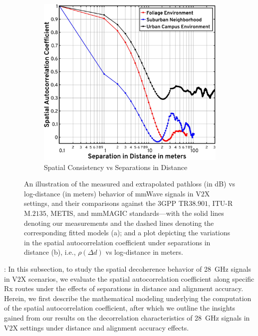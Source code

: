 \documentclass[10pt, twocolumn]{IEEEtran}
\begin{document}
{\begin{figure} [t]
    \begin{subfigure}{0.5\linewidth}
        \centering
        \includegraphics[width=1.0\linewidth]{figs/spatial_consistency_vs_distance.pdf}
        \caption{Spatial Consistency vs Separations in Distance}
        \label{F7b}
    \end{subfigure}
    \vspace{-8mm}
    \caption{An illustration of the measured and extrapolated pathloss (in dB) vs log-distance (in meters) behavior of mmWave signals in V$2$X settings, and their comparisons against the $3$GPP TR$38.901$, ITU-R M.$2135$, METIS, and mmMAGIC standards---with the solid lines denoting our measurements and the dashed lines denoting the corresponding fitted models (a); and a plot depicting the variations in the spatial autocorrelation coefficient under separations in distance (b), i.e., $\rho(\Delta d)$ vs log-distance in meters.}
    \label{F7}
\end{figure}

: In this subsection, to study the spatial decoherence behavior of \SI{28}{\giga\hertz} signals in V$2$X scenarios, we evaluate the spatial autocorrelation coefficient along specific Rx routes under the effects of separations in distance and alignment accuracy. Herein, we first describe the mathematical modeling underlying the computation of the spatial autocorrelation coefficient, after which we outline the insights gained from our results on the decorrelation characteristics of \SI{28}{\giga\hertz} signals in V$2$X settings under distance and alignment accuracy effects.

}
\end{document}
